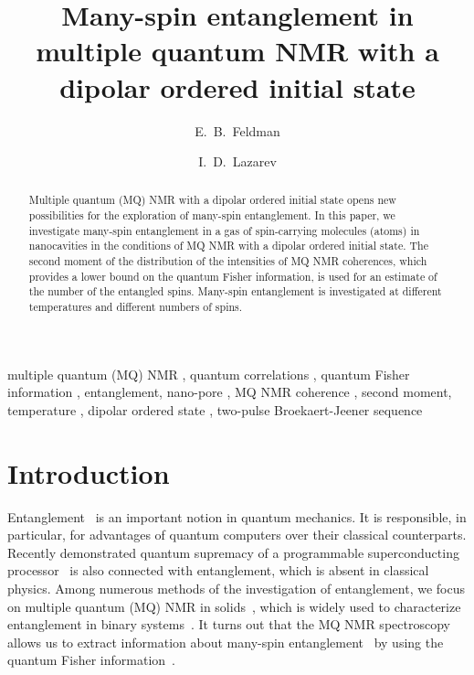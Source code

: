 \documentclass[review]{elsarticle}
\begin{document}
\begin{frontmatter}

\title{Many-spin entanglement in multiple quantum NMR with a dipolar ordered initial state}

\author[icp]{E.~B.~Feldman}
\author[icp,msu]{I.~D.~Lazarev} %

\address[icp]{Institute of Problems of Chemical Physics of Russian Academy of Sciences, \\ Chernogolovka, Moscow Region, Russia 142432}
\address[msu]{Faculty of Fundamental Physical-Chemical Engineering, Lomonosov Moscow State University, GSP-1, Moscow, Russia 119991}



\begin{abstract}
Multiple quantum (MQ) NMR with a dipolar ordered initial state opens new possibilities for the exploration of many-spin entanglement. 
In this paper, we investigate many-spin entanglement in a gas of spin-carrying molecules (atoms) in nanocavities 
in the conditions of MQ NMR with a dipolar ordered initial state.
The second moment of the distribution of the intensities of MQ NMR coherences,
which provides a lower bound on the quantum Fisher information, 
is used for an estimate of the number of the entangled spins. 
Many-spin entanglement is investigated at different temperatures and different numbers of spins.
\end{abstract}

\begin{keyword}
multiple quantum (MQ) NMR \sep  
quantum correlations \sep 
quantum Fisher information \sep 
entanglement, nano-pore \sep 
MQ NMR coherence \sep 
second moment, temperature \sep 
dipolar ordered state \sep 
two-pulse Broekaert-Jeener sequence
\end{keyword}

\end{frontmatter}

\linenumbers

\section{Introduction}
\label{sec:1}

Entanglement~\cite{Nielsen_2009} is an important notion in quantum mechanics. It is responsible, in particular, for advantages of quantum computers over their classical counterparts.
Recently demonstrated quantum supremacy of a programmable superconducting processor~\cite{Arute2019} is also connected with entanglement, which is absent in classical physics.
Among numerous methods of the investigation of entanglement, we focus on multiple quantum (MQ) NMR in solids~\cite{Baum_1985}, which is widely used to characterize entanglement in binary systems~\cite{Furman_2008,Furman_2009,Fel_dman_2008,Fel_dman_2012}. 
It turns out that the MQ NMR spectroscopy~\cite{Baum_1985} allows us to extract information about many-spin entanglement~\cite{G_rttner_2018} by using the quantum Fisher information~\cite{T_th_2014,Pezz__2018}.
\end{document}
